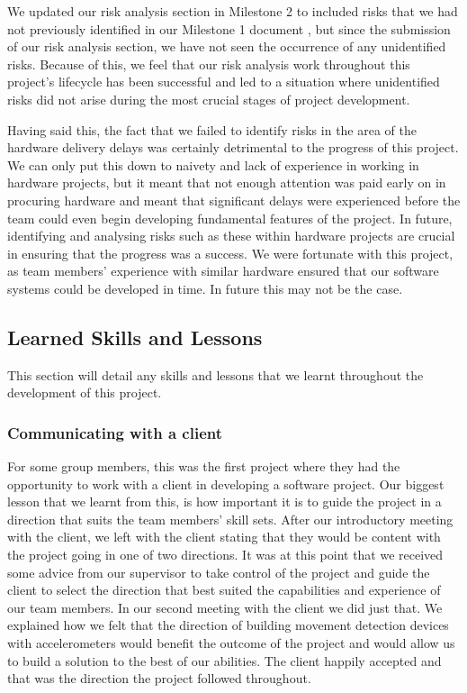             We updated our risk analysis section in Milestone 2 \cite{mile2} to included risks that we had not previously identified in our Milestone 1 document \cite{coaker}, but since the submission of our risk analysis section, we have not seen the occurrence of any unidentified risks. Because of this, we feel that our risk analysis work throughout this project's lifecycle has been successful and led to a situation where unidentified risks did not arise during the most crucial stages of project development.

            Having said this, the fact that we failed to identify risks in the area of the hardware delivery delays was certainly detrimental to the progress of this project. We can only put this down to naivety and lack of experience in working in hardware projects, but it meant that not enough attention was paid early on in procuring hardware and meant that significant delays were experienced before the team could even begin developing fundamental features of the project. In future, identifying and analysing risks such as these within hardware projects are crucial in ensuring that the progress was a success. We were fortunate with this project, as team members' experience with similar hardware ensured that our software systems could be developed in time. In future this may not be the case.

        \subsection{Learned Skills and Lessons}

            This section will detail any skills and lessons that we learnt throughout the development of this project.

            \subsubsection{Communicating with a client}

                For some group members, this was the first project where they had the opportunity to work with a client in developing a software project. Our biggest lesson that we learnt from this, is how important it is to guide the project in a direction that suits the team members' skill sets. After our introductory meeting with the client, we left with the client stating that they would be content with the project going in one of two directions. It was at this point that we received some advice from our supervisor to take control of the project and guide the client to select the direction that best suited the capabilities and experience of our team members. In our second meeting with the client we did just that. We explained how we felt that the direction of building movement detection devices with accelerometers would benefit the outcome of the project and would allow us to build a solution to the best of our abilities. The client happily accepted and that was the direction the project followed throughout.
                
